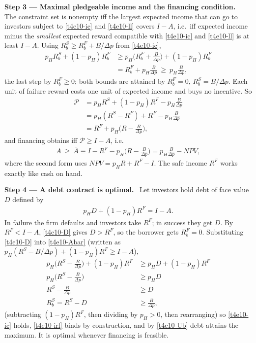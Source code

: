 \documentclass[11pt,a4paper]{article}
\newcommand{\step}[2]{\par\medskip\noindent\textbf{Step #1 --- #2.}~}
\begin{document}
\step{3}{Maximal pledgeable income and the financing condition} The constraint set is nonempty iff
the largest expected income that can go to investors subject to \eqref{t4e10-ic} and
\eqref{t4e10-ll} covers $I-A$, i.e.\ iff expected income minus the \emph{smallest} expected reward
compatible with \eqref{t4e10-ic} and \eqref{t4e10-ll} is at least $I-A$. Using
$R_b^S\ge R_b^F+B/\Delta p$ from \eqref{t4e10-ic},
\begin{align}
  p_HR_b^S+(1-p_H)R_b^F &\ge p_H\Big(R_b^F+\frac{B}{\Delta p}\Big)+(1-p_H)R_b^F \nonumber\\
                        &= R_b^F+p_H\frac{B}{\Delta p}\ \ge\ p_H\frac{B}{\Delta p}, \nonumber
\end{align}
the last step by $R_b^F\ge0$; both bounds are attained by $R_b^F=0$, $R_b^S=B/\Delta p$. Each unit of
failure reward costs one unit of expected income and buys no incentive. So
\begin{align}
  \mathcal{P} &= p_HR^S+(1-p_H)R^F-p_H\frac{B}{\Delta p} \nonumber\\
              &= p_H(R^S-R^F)+R^F-p_H\frac{B}{\Delta p} \nonumber\\
              &= R^F+p_H\Big(R-\frac{B}{\Delta p}\Big), \label{t4e10-P}
\end{align}
and financing obtains iff $\mathcal{P}\ge I-A$, i.e.
\begin{align}
  A\ \ge\ \bar A\equiv I-R^F-p_H\Big(R-\frac{B}{\Delta p}\Big)=p_H\frac{B}{\Delta p}-\mathit{NPV}, \label{t4e10-Abar}
\end{align}
where the second form uses $\mathit{NPV}=p_HR+R^F-I$.
The safe income $R^F$ works exactly like cash on hand.

\step{4}{A debt contract is optimal} Let investors hold debt of face value $D$ defined by
\begin{align}
  p_HD+(1-p_H)R^F = I-A. \label{t4e10-D}
\end{align}
In failure the firm defaults and investors take $R^F$; in success they get $D$. By $R^F<I-A$,
\eqref{t4e10-D} gives $D>R^F$, so the borrower gets $R_b^F=0$. Substituting \eqref{t4e10-D} into
\eqref{t4e10-Abar} (written as $p_H(R^S-B/\Delta p)+(1-p_H)R^F\ge I-A$),
\begin{align}
  p_H\Big(R^S-\frac{B}{\Delta p}\Big)+(1-p_H)R^F &\ge p_HD+(1-p_H)R^F \nonumber\\
  p_H\Big(R^S-\frac{B}{\Delta p}\Big) &\ge p_HD \nonumber\\
  R^S-\frac{B}{\Delta p} &\ge D \nonumber\\
  R_b^S=R^S-D &\ge \frac{B}{\Delta p}, \label{t4e10-debtic}
\end{align}
(subtracting $(1-p_H)R^F$, then dividing by $p_H>0$, then rearranging)
so \eqref{t4e10-ic} holds, \eqref{t4e10-irl} binds by construction, and by \eqref{t4e10-Ub} debt
attains the maximum. It is optimal whenever financing is feasible.
\end{document}
